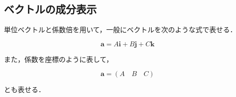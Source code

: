 \documentclass[a4paper,11pt]{ltjsarticle}
\numberwithin{equation}{section}
\begin{document}
\subsection{ベクトルの成分表示}

単位ベクトルと係数倍を用いて，一般にベクトルを次のような式で表せる．

\begin{equation}
  \bm{a}=A \bm{i}+B \bm{j}+C \bm{k}
\end{equation}

また，係数を座標のように表して，

\begin{equation}
  \bm{a}=(A \quad B \quad C)
\end{equation}

とも表せる．

\clearpage

\pagestyle{fancy}
\lhead{}
\rhead{\textbf{\thepage}}



\nocite{*}

\printindex
\end{document}
